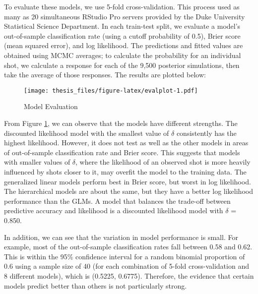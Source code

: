 \documentclass[12pt,twoside]{dukestatscithesis}
\theoremstyle{definition}
\theoremstyle{definition}
\theoremstyle{definition}
\theoremstyle{remark}
\begin{document}
To evaluate these models, we use 5-fold cross-validation. This process
used as many as 20 simultaneous RStudio Pro servers provided by the Duke
University Statistical Science Department. In each train-test split, we
evaluate a model's out-of-sample classification rate (using a cutoff
probability of 0.5), Brier score (mean squared error), and log
likelihood. The predictions and fitted values are obtained using MCMC
averages; to calculate the probability for an individual shot, we
calculate a response for each of the 9,500 posterior simulations, then
take the average of those responses. The results are plotted below:
\begin{figure}[htbp]
\centering
\texttt{[image: thesis\_files/figure-latex/evalplot-1.pdf]}
\caption{\label{fig:evalplot}Model Evaluation}
\end{figure}
From Figure \ref{fig:evalplot}, we can observe that the models have
different strengths. The discounted likelihood model with the smallest
value of \(\delta\) consistently has the highest likelihood. However, it
does not test as well as the other models in areas of out-of-sample
classification rate and Brier score. This suggests that models with
smaller values of \(\delta\), where the likelihood of an observed shot
is more heavily influenced by shots closer to it, may overfit the model
to the training data. The generalized linear models perform best in
Brier score, but worst in log likelihood. The hierarchical models are
about the same, but they have a better log likelihood performance than
the GLMs. A model that balances the trade-off between predictive
accuracy and likelihood is a discounted likelihood model with \(\delta\)
= 0.850.

In addition, we can see that the variation in model performance is
small. For example, most of the out-of-sample classification rates fall
between 0.58 and 0.62. This is within the 95\% confidence interval for a
random binomial proportion of 0.6 using a sample size of 40 (for each
combination of 5-fold cross-validation and 8 different models), which is
(0.5225, 0.6775). Therefore, the evidence that certain models predict
better than others is not particularly strong.
\end{document}
